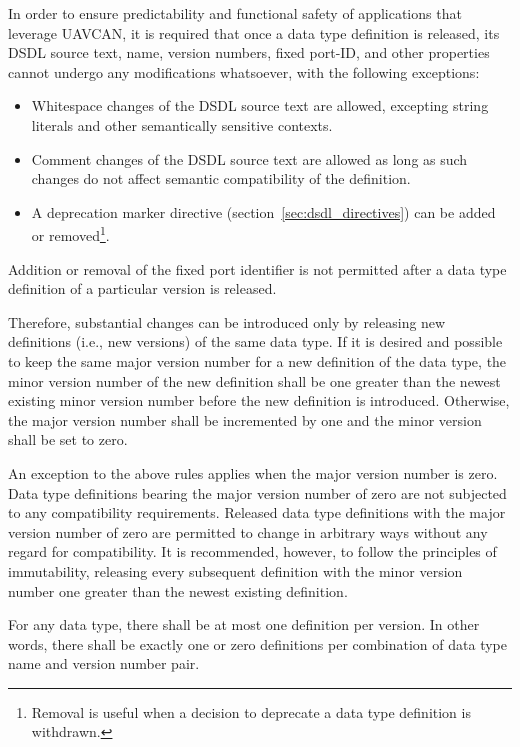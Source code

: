 In order to ensure predictability and functional safety of applications that leverage UAVCAN,
it is required that once a data type definition is released,
its DSDL source text, name, version numbers, fixed port-ID, and other properties cannot undergo any
modifications whatsoever, with the following exceptions:
\begin{itemize}
    \item Whitespace changes of the DSDL source text are allowed,
    excepting string literals and other semantically sensitive contexts.

    \item Comment changes of the DSDL source text are allowed as long as such changes
    do not affect semantic compatibility of the definition.

    \item A deprecation marker directive (section~\ref{sec:dsdl_directives}) can be added or removed\footnote{%
    Removal is useful when a decision to deprecate a data type definition is withdrawn.}.
\end{itemize}
Addition or removal of the fixed port identifier is not permitted after a data type definition
of a particular version is released.

Therefore, substantial changes can be introduced only by releasing new definitions (i.e., new versions)
of the same data type.
If it is desired and possible to keep the same major version number for a new definition of the data type,
the minor version number of the new definition shall be one greater than the newest existing minor version
number before the new definition is introduced.
Otherwise, the major version number shall be incremented by one and the minor version shall be set to zero.

An exception to the above rules applies when the major version number is zero.
Data type definitions bearing the major version number of zero are not subjected to any compatibility requirements.
Released data type definitions with the major version number of zero are permitted to change in arbitrary
ways without any regard for compatibility.
It is recommended, however, to follow the principles of immutability, releasing every subsequent definition
with the minor version number one greater than the newest existing definition.

For any data type, there shall be at most one definition per version.
In other words, there shall be exactly one or zero definitions
per combination of data type name and version number pair.

